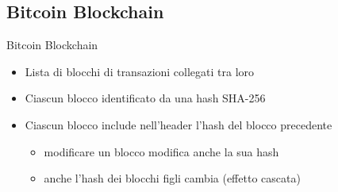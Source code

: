 \documentclass{beamer}
\begin{document}




  \subsection{Bitcoin Blockchain}
  \begin{frame}{Bitcoin Blockchain}
     \begin{itemize}
         \item Lista di blocchi di transazioni collegati tra loro
         \item Ciascun blocco identificato da una hash SHA-256
         \item Ciascun blocco include nell'header l'hash del blocco precedente
         \begin{itemize}
             \item modificare un blocco modifica anche la sua hash
             \item anche l'hash dei blocchi figli cambia (effetto cascata)
         \end{itemize}
     \end{itemize}
  \end{frame}
  
\end{document}
